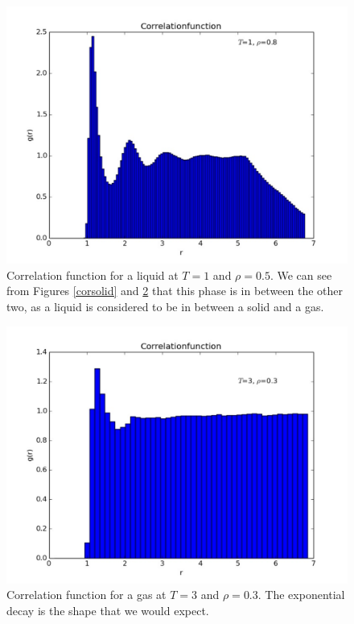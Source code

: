 \documentclass{article}
\begin{document}
\begin{multicols}{2}
\begin{figure}[H]
\begin{center}
\includegraphics[width=\linewidth]{plots/corfunct1rho08n864lp500.pdf}
\caption{Correlation function for a liquid at $T=1$ and $\rho=0.5$.  We can see from Figures \ref{corsolid} and \ref{corgas} that this phase is in between the other two, as a liquid is considered to be in between a solid and a gas.}
\label{corliquid}
\end{center}
\end{figure}

\begin{figure}[H]
\begin{center}
\includegraphics[width=\linewidth]{plots/correlationfunctionT3Rho03x.pdf}
\caption{Correlation function for a gas at $T=3$ and $\rho = 0.3$.  The exponential decay is the shape that we would expect.}
\label{corgas}
\end{center}
\end{figure}


\end{multicols}
\end{document}
